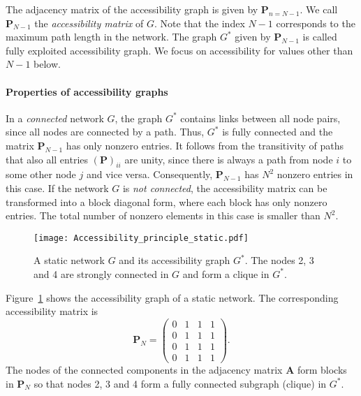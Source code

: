 The adjacency matrix of the accessibility graph is given by $\mathbf{P}_{n=N-1}$.
We call $\mathbf{P}_{N-1}$ the \emph{accessibility matrix} of $G$.
Note that the index $N-1$ corresponds to the maximum path length in the network.
The graph $G^*$ given by $\mathbf{P}_{N-1}$ is called fully exploited accessibility graph.
We focus on accessibility for values other than $N-1$ below.

\paragraph{Properties of accessibility graphs\color{Cayenne}{.}}
In a \emph{connected} network $G$, the graph $G^*$ contains links between all node pairs, since all nodes are connected by a path.
Thus, $G^*$ is fully connected and the matrix $\mathbf{P}_{N-1}$ has only nonzero entries.
It follows from the transitivity of paths that also all entries $(\mathbf{P})_{ii}$ are unity, since there is always a path from node $i$ to some other node $j$ and vice versa.
Consequently, $\mathbf{P}_{N-1}$ has $N^2$ nonzero entries in this case.
If the network $G$ is \emph{not connected}, the accessibility matrix can be transformed into a block diagonal form, where each block has only nonzero entries.
The total number of nonzero elements in this case is smaller than $N^2$.

%
\begin{figure}[htb]
\begin{center}
\texttt{[image: Accessibility\_principle\_static.pdf]}
\caption{A static network $G$ and its accessibility graph $G^*$.
The nodes 2, 3 and 4 are strongly connected in $G$ and form a clique in $G^*$.}
\label{fig:access_static}
\end{center}
\end{figure}
%
Figure~\ref{fig:access_static} shows the accessibility graph of a static network.
The corresponding accessibility matrix is
\begin{equation*}
\mathbf{P}_N=\left(%
\begin{array}{c|ccc}%
0 & 1 & 1 & 1 \\
\hline 0 & 1 & 1 & 1 \\
0 & 1 & 1 & 1 \\
0 & 1 & 1 & 1
\end{array}\right) .
\end{equation*}
The nodes of the connected components in the adjacency matrix $\mathbf{A}$ form blocks in $\mathbf{P}_N$ so that nodes 2, 3 and 4 form a fully connected subgraph (clique) in $G^*$.


